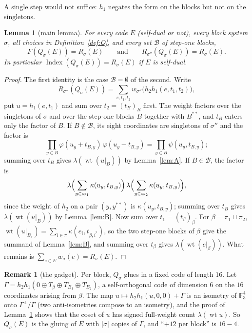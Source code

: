 \documentclass[11pt]{amsart}
\newtheorem{lemma}[theorem]{Lemma}
\theoremstyle{definition}
\newtheorem{remark}[theorem]{Remark}
\newcommand{\F}{\mathbb{F}_3}
\newcommand{\wt}{\operatorname{wt}}
\newcommand{\Index}{\operatorname{Index}}
\newcommand{\cB}{\mathcal{B}}
\begin{document}
A single step would not suffice: $h_1$ negates the form on the blocks but not on the singletons.

\begin{lemma}[main lemma]\label{lem:main}
For every code $E$ (self-dual or not), every block system $\sigma$, all choices in
Definition~\ref{def:Q}, and every set $\cB$ of step-one blocks,
\[
  F(Q_\sigma(E))=R_\sigma(E)\qquad\text{and}\qquad R_{\sigma''}(Q_\sigma(E))=R_\sigma(E).
\]
In particular $\Index(Q_\sigma(E))=R_\sigma(E)$ if $E$ is self-dual.
\end{lemma}

\begin{proof}
The first identity is the case $\cB=\emptyset$ of the second. Write
\[
  R_{\sigma''}(Q_\sigma(E))=\sum_{e,t_1,t_2}w_{\sigma''}\bigl(h_2h_1(e,t_1,t_2)\bigr),
\]
put $u=h_1(e,t_1)$ and sum over $t_2=(t_B)_B$ first. The weight factors over the singletons of $\sigma$ and over the step-one
blocks $B$ together with $B^{**}$, and $t_B$ enters only the factor of $B$. If $B\notin\cB$, its
eight coordinates are singletons of $\sigma''$ and the factor is
\[
  \prod_{y\in B}\varphi(u_y+t_{B,y})\,\varphi(u_y-t_{B,y})=\prod_{y\in B}\psi(u_y,t_{B,y});
\]
summing over $t_B$ gives $\lambda(\wt(u|_B))$ by Lemma~\ref{lem:A}. If $B\in\cB$, the factor is
\[
  \lambda\Bigl(\sum_{y\in\varpi_1}\kappa(u_y,t_{B,y})\Bigr)\,
  \lambda\Bigl(\sum_{y\in\varpi_2}\kappa(u_y,t_{B,y})\Bigr),
\]
since the weight of $h_2$ on a pair $(y,y^{**})$ is $\kappa(u_y,t_{B,y})$; summing over $t_B$ gives
$\lambda(\wt(u|_B))$ by Lemma~\ref{lem:B}. Now sum over $t_1=(t_\beta)_\beta$.
For $\beta=\pi_1\sqcup\pi_2$, $\wt(u|_{B_{\pi}})=\sum_{i\in\pi}\kappa(e_i,t_{\beta,i^*})$, so the two
step-one blocks of $\beta$ give the summand of Lemma~\ref{lem:B}, and summing over $t_\beta$ gives
$\lambda(\wt(e|_\beta))$. What remains is $\sum_{e\in E}w_\sigma(e)=R_\sigma(E)$.
\end{proof}

\begin{remark}[the gadget]\label{rem:gadget}
Per block, $Q_\sigma$ glues in a fixed code of length $16$. Let
$\Gamma=h_2h_1(0\oplus T_\beta\oplus T_{B_1}\oplus T_{B_2})$, a self-orthogonal code of dimension $6$ on
the $16$ coordinates arising from $\beta$. The map $u\mapsto h_2h_1(u,0,0)+\Gamma$ is an isometry of
$\F^4$ onto $\Gamma^\perp/\Gamma$ (two anti-isometries compose to an isometry), and the proof of
Lemma~\ref{lem:main} shows that the coset of $u$ has signed full-weight count $\lambda(\wt u)$. So
$Q_\sigma(E)$ is the gluing of $E$ with $|\sigma|$ copies of $\Gamma$, and ``$+12$ per block'' is
$16-4$.
\end{remark}
\end{document}
